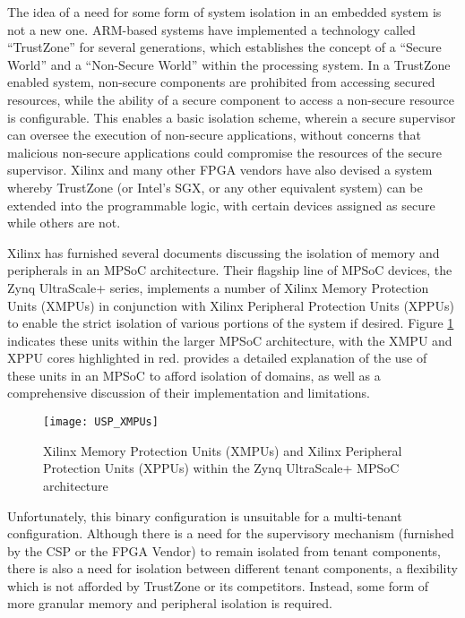 The idea of a need for some form of system isolation in an embedded system is not a new one. ARM-based systems have implemented a technology called ``TrustZone'' for several generations, which establishes the concept of a ``Secure World'' and a ``Non-Secure World'' within the processing system. In a TrustZone enabled system, non-secure components are prohibited from accessing secured resources, while the ability of a secure component to access a non-secure resource is configurable. This enables a basic isolation scheme, wherein a secure supervisor can oversee the execution of non-secure applications, without concerns that malicious non-secure applications could compromise the resources of the secure supervisor. Xilinx and many other FPGA vendors have also devised a system whereby TrustZone (or Intel's SGX, or any other equivalent system) can be extended into the programmable logic, with certain devices assigned as secure while others are not. 

Xilinx has furnished several documents discussing the isolation of memory and peripherals in an MPSoC architecture. Their flagship line of MPSoC devices, the Zynq UltraScale+ series, implements a number of Xilinx Memory Protection Units (XMPUs) in conjunction with Xilinx Peripheral Protection Units (XPPUs) to enable the strict isolation of various portions of the system if desired. Figure \ref{fig:XMPPUs} indicates these units within the larger MPSoC architecture, with the XMPU and XPPU cores highlighted in red. \cite{mcneil_isolation_2021} provides a detailed explanation of the use of these units in an MPSoC to afford isolation of domains, as well as a comprehensive discussion of their implementation and limitations.

\begin{figure}[h]
    \centering
    \texttt{[image: USP\_XMPUs]}
    \caption [XMPU and XPPUs in a Zynq UltraScale+]{Xilinx Memory Protection Units (XMPUs) and Xilinx Peripheral Protection Units (XPPUs) within the Zynq UltraScale+ MPSoC architecture}
    \label{fig:XMPPUs}
\end{figure}

Unfortunately, this binary configuration is unsuitable for a multi-tenant configuration. Although there is a need for the supervisory mechanism (furnished by the CSP or the FPGA Vendor) to remain isolated from tenant components, there is also a need for isolation between different tenant components, a flexibility which is not afforded by TrustZone or its competitors. Instead, some form of more granular memory and peripheral isolation is required.

